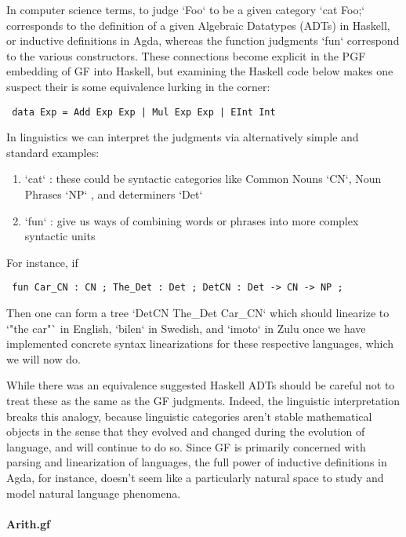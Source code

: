 In computer science terms, to judge `Foo` to be a given category `cat Foo;`
corresponds to the definition of a given Algebraic Datatypes (ADTs) in Haskell,
or inductive definitions in Agda, whereas the function judgments `fun`
correspond to the various constructors. These connections become explicit in the
PGF embedding of GF into Haskell, but examining the Haskell code below makes one
suspect their is some equivalence lurking in the corner:

\begin{verbatim} data Exp = Add Exp Exp | Mul Exp Exp | EInt Int
\end{verbatim}

In linguistics we can interpret the judgments via alternatively simple and
standard examples:

\begin{enumerate}
\item `cat` : these could be syntactic categories like Common Nouns `CN`, Noun
Phrases `NP` , and determiners `Det`
\item `fun` : give us ways of combining words or phrases into more complex
syntactic units
\end {enumerate}

For instance, if

\begin{verbatim} fun Car_CN : CN ; The_Det : Det ; DetCN : Det -> CN -> NP ;
\end{verbatim}

Then one can form a tree `DetCN The_Det Car_CN` which should linearize to `"the
car"` in English, `bilen` in Swedish, and `imoto` in Zulu once we have
implemented concrete syntax linearizations for these respective languages, which
we will now do.

While there was an equivalence suggested Haskell ADTs should be careful not to
treat these as the same as the GF judgments. Indeed, the linguistic
interpretation breaks this analogy, because linguistic categories aren't stable
mathematical objects in the sense that they evolved and changed during the
evolution of language, and will continue to do so. Since GF is primarily
concerned with parsing and linearization of languages, the full power of
inductive definitions in Agda, for instance, doesn't seem like a particularly
natural space to study and model natural language phenomena.


\paragraph{Arith.gf}

